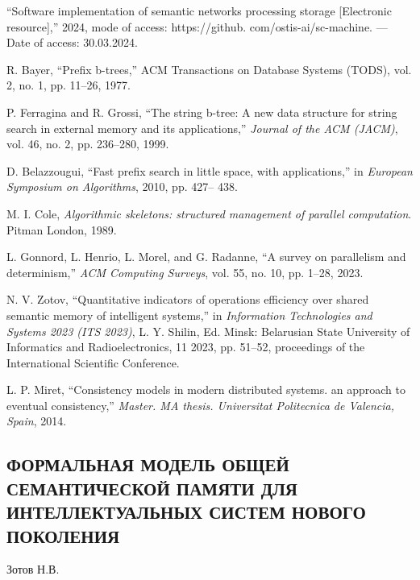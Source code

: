 \documentclass[10pt]{article}
\begin{document}
\begin{thebibliography}{99}
“Software implementation of semantic networks processing storage
[Electronic resource],” 2024, mode of access: https://github.
com/ostis-ai/sc-machine. — Date of access: 30.03.2024.

R. Bayer, “Prefix b-trees,” ACM Transactions on Database Systems
(TODS), vol. 2, no. 1, pp. 11–26, 1977.

P. Ferragina and R. Grossi, “The string b-tree: A new data structure
for string search in external memory and its applications,”
\textit{Journal of the ACM (JACM)}, vol. 46, no. 2, pp. 236–280, 1999.

D. Belazzougui, “Fast prefix search in little space, with applications,”
in \textit{European Symposium on Algorithms}, 2010, pp. 427–
438.

M. I. Cole, \textit{Algorithmic skeletons: structured management of
parallel computation}. Pitman London, 1989.

L. Gonnord, L. Henrio, L. Morel, and G. Radanne, “A survey on
parallelism and determinism,” \textit{ACM Computing Surveys}, vol. 55,
no. 10, pp. 1–28, 2023.

N. V. Zotov, “Quantitative indicators of operations efficiency over
shared semantic memory of intelligent systems,” in \textit{Information
Technologies and Systems 2023 (ITS 2023)}, L. Y. Shilin, Ed.
Minsk: Belarusian State University of Informatics and Radioelectronics,
11 2023, pp. 51–52, proceedings of the International
Scientific Conference.

L. P. Miret, “Consistency models in modern distributed systems.
an approach to eventual consistency,” \textit{Master. MA thesis. Universitat
Politecnica de Valencia, Spain}, 2014.
\end{thebibliography}
\begin{center}
  \section*{ФОРМАЛЬНАЯ МОДЕЛЬ ОБЩЕЙ
СЕМАНТИЧЕСКОЙ ПАМЯТИ ДЛЯ
ИНТЕЛЛЕКТУАЛЬНЫХ СИСТЕМ
НОВОГО ПОКОЛЕНИЯ}

\Large
Зотов Н.В.  
\end{center}

\\ 
\end{document}
